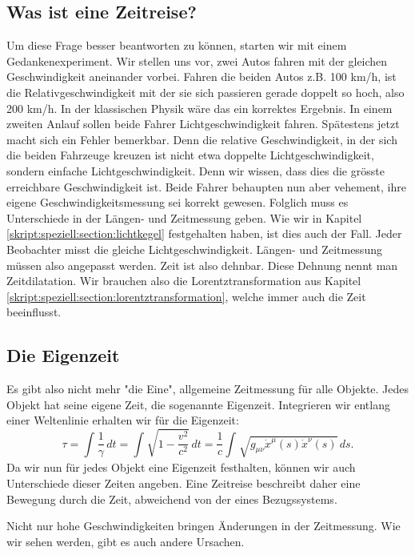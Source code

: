 \begin{refsection}
\section{Was ist eine Zeitreise?}
Um diese Frage besser beantworten zu können, starten wir mit einem Gedankenexperiment. Wir stellen uns vor, zwei Autos fahren mit der gleichen Geschwindigkeit aneinander vorbei. Fahren die beiden Autos z.B. 100 km/h, ist die Relativgeschwindigkeit mit der sie sich passieren gerade doppelt so hoch, also 200 km/h. In der klassischen Physik wäre das ein korrektes Ergebnis. In einem zweiten Anlauf sollen beide Fahrer Lichtgeschwindigkeit fahren. Spätestens jetzt macht sich ein Fehler bemerkbar. Denn die relative Geschwindigkeit, in der sich die beiden Fahrzeuge kreuzen ist nicht etwa doppelte Lichtgeschwindigkeit, sondern einfache Lichtgeschwindigkeit. Denn wir wissen, dass dies die grösste erreichbare Geschwindigkeit ist.
Beide Fahrer behaupten nun aber vehement, ihre eigene Geschwindigkeitsmessung sei korrekt gewesen. Folglich muss es Unterschiede in der Längen- und Zeitmessung geben.
Wie wir in Kapitel \ref{skript:speziell:section:lichtkegel} festgehalten haben, ist dies auch der Fall. Jeder Beobachter misst die gleiche Lichtgeschwindigkeit. Längen- und Zeitmessung müssen also angepasst werden. Zeit ist also dehnbar. Diese Dehnung nennt man Zeitdilatation. Wir brauchen also die Lorentztransformation aus Kapitel \ref{skript:speziell:section:lorentztransformation}, welche immer auch die Zeit beeinflusst.

\subsection{Die Eigenzeit}
Es gibt also nicht mehr "die Eine", allgemeine Zeitmessung für alle Objekte. Jedes Objekt hat seine eigene Zeit, die sogenannte Eigenzeit.
Integrieren wir entlang einer Weltenlinie erhalten wir für die Eigenzeit:
\begin{equation}\label{Eigenzeit}
\tau
=
\int_{}^{}\frac{1}{\gamma}\,dt=\int_{}^{}\sqrt{1-\frac{v^2}{c^2}}\,dt
=
\frac{1}{c}\int_{}^{}\sqrt{g_{\mu\nu}\dot{x}^{\mu}(s)\dot{x}^{\nu}(s)}\,ds.
\end{equation}
Da wir nun für jedes Objekt eine Eigenzeit festhalten, können wir auch Unterschiede dieser Zeiten angeben.
Eine Zeitreise beschreibt daher eine Bewegung durch die Zeit, abweichend von der eines Bezugssystems. 

Nicht nur hohe Geschwindigkeiten bringen Änderungen in der Zeitmessung. Wie wir sehen werden, gibt es auch andere Ursachen.


\end{refsection}
